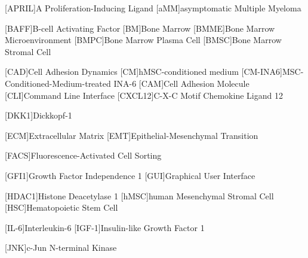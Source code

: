 
%
\vspace{-\vfull}
\label{sec:Abbreviations}%
{%
    \footnotesize%
    \begin{spacing}{-.0}%
        \begin{acronym}%
            [APRIL]{A Proliferation-Inducing Ligand} %
            [aMM]{asymptomatic Multiple Myeloma}

            [BAFF]{B-cell Activating Factor}
            [BM]{Bone Marrow}
            [BMME]{Bone Marrow Microenvironment}
            [BMPC]{Bone Marrow Plasma Cell}
            [BMSC]{Bone Marrow Stromal Cell}

            [CAD]{Cell Adhesion Dynamics}
            [CM]{hMSC-conditioned medium}
            [CM-INA6]{MSC-Conditioned-Medium-treated INA-6}
            [CAM]{Cell Adhesion Molecule}
            [CLI]{Command Line Interface}
            [CXCL12]{C-X-C Motif Chemokine Ligand 12}

            [DKK1]{Dickkopf-1}

            [ECM]{Extracellular Matrix}
            [EMT]{Epithelial-Mesenchymal Transition}

            [FACS]{Fluorescence-Activated Cell Sorting}

            [GFI1]{Growth Factor Independence 1}
            [GUI]{Graphical User Interface}

            [HDAC1]{Histone Deacetylase 1}
            [hMSC]{human Mesenchymal Stromal Cell}
            [HSC]{Hematopoietic Stem Cell}

            [IL-6]{Interleukin-6}
            [IGF-1]{Insulin-like Growth Factor 1}

            [JNK]{c-Jun N-terminal Kinase}
            

\end{acronym}
\end{spacing}}
